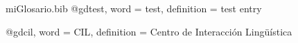 \begin{filecontents*}{miGlosario.bib}
	@gd{test,
		word = {test},
		definition = {test entry}
	}
	
	@gd{cil,
		word = {CIL},
		definition = {Centro de Interacción Lingüística}
	}
	
	
\end{filecontents*}

\makegloss